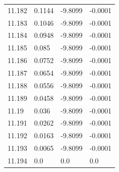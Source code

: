 \begin{tabular}{llll}
11.182 & 0.1144 & -9.8099 & -0.0001 \\
11.183 & 0.1046 & -9.8099 & -0.0001 \\
11.184 & 0.0948 & -9.8099 & -0.0001 \\
11.185 & 0.085 & -9.8099 & -0.0001 \\
11.186 & 0.0752 & -9.8099 & -0.0001 \\
11.187 & 0.0654 & -9.8099 & -0.0001 \\
11.188 & 0.0556 & -9.8099 & -0.0001 \\
11.189 & 0.0458 & -9.8099 & -0.0001 \\
11.19 & 0.036 & -9.8099 & -0.0001 \\
11.191 & 0.0262 & -9.8099 & -0.0001 \\
11.192 & 0.0163 & -9.8099 & -0.0001 \\
11.193 & 0.0065 & -9.8099 & -0.0001 \\
11.194 & 0.0 & 0.0 & 0.0 \\
\bottomrule
\end{tabular}
